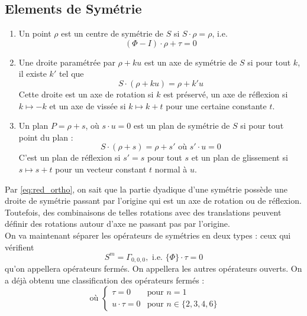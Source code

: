 \documentclass{cours}
\begin{document}
\subsection{Elements de Symétrie}
\begin{definition}\label{def:sym_elem}
    \begin{enumerate}
        \item Un point $\rho$ est un centre de symétrie de $S$ si $S \cdot \rho = \rho$, i.e.
              \begin{equation}\label{eq:sym_cen}
                  (\Phi - I) \cdot \rho + \tau = 0
              \end{equation}
        \item Une droite paramétrée par $\rho + ku$ est un axe de symétrie de $S$ si pour tout $k$, il existe $k'$ tel que 
        \begin{equation}\label{eq:sym_ax}
            S \cdot (\rho + ku) = \rho + k'u
        \end{equation}
        Cette droite est un axe de rotation si $k$ est préservé, un axe de réflexion si $k \mapsto -k$ et un axe de vissée si $k \mapsto k + t$ pour une certaine constante $t$.
        \item Un plan $P = \rho + s$, où $s\cdot u = 0$ est un plan de symétrie de $S$ si pour tout point du plan : 
        \begin{equation}\label{eq:sym_plan}
            S \cdot (\rho + s) = \rho + s' \text{ où } s' \cdot u = 0
        \end{equation}
        C'est un plan de réflexion si $s' = s$ pour tout $s$ et un plan de glissement si $s\mapsto s + t$ pour un vecteur constant $t$ normal à $u$. 
    \end{enumerate}
\end{definition}
Par \ref{eq:red_ortho}, on sait que la partie dyadique d'une symétrie possède une droite de symétrie passant par l'origine qui est un axe de rotation ou de réflexion. Toutefois, des combinaisons de telles rotations avec des translations peuvent définir des rotations autour d'axe ne passant pas par l'origine. \\
On va maintenant séparer les opérateurs de symétries en deux types : ceux qui vérifient 
\begin{equation}
    S^{m} = \Gamma_{0, 0, 0}, \text{ i.e. } \{\Phi\} \cdot \tau = 0
\end{equation}
qu'on appellera opérateurs fermés. On appellera les autres opérateurs ouverts. On a déjà obtenu une classification des opérateurs fermés : 
\begin{equation}
    [n \mid \tau] \text{ où } \begin{cases}
        \tau = 0 & \text{pour } n = 1\\
        u\cdot \tau = 0 & \text{pour } n \in \{2, 3, 4, 6\}
    \end{cases}
\end{equation}
\end{document}
